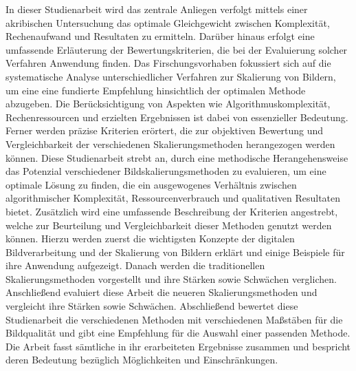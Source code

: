     In dieser Studienarbeit wird das zentrale Anliegen verfolgt mittels einer akribischen Untersuchung das optimale Gleichgewicht zwischen Komplexität, Rechenaufwand und Resultaten zu ermitteln. 
    Darüber hinaus erfolgt eine umfassende Erläuterung der Bewertungskriterien, die bei der Evaluierung solcher Verfahren Anwendung finden. 
    Das Firschungsvorhaben fokussiert sich auf die systematische Analyse unterschiedlicher Verfahren zur Skalierung von Bildern, um eine eine fundierte Empfehlung hinsichtlich der optimalen Methode abzugeben. 
    Die Berücksichtigung von Aspekten wie Algorithmuskomplexität, Rechenressourcen und erzielten Ergebnissen ist dabei von essenzieller Bedeutung. 
    Ferner werden präzise Kriterien erörtert, die zur objektiven Bewertung und Vergleichbarkeit der verschiedenen Skalierungsmethoden herangezogen werden können.
    Diese Studienarbeit strebt an, durch eine methodische Herangehensweise das Potenzial verschiedener Bildskalierungsmethoden zu evaluieren, um eine optimale Lösung zu finden, die ein ausgewogenes Verhältnis zwischen algorithmischer Komplexität, Ressourcenverbrauch und qualitativen Resultaten bietet. 
    Zusätzlich wird eine umfassende Beschreibung der Kriterien angestrebt, welche zur Beurteilung und Vergleichbarkeit dieser Methoden genutzt werden können.
    Hierzu werden zuerst die wichtigsten Konzepte der digitalen Bildverarbeitung und der Skalierung von Bildern erklärt und einige Beispiele für ihre Anwendung aufgezeigt. 
    Danach werden die traditionellen Skalierungsmethoden vorgestellt und  ihre Stärken sowie Schwächen verglichen. 
    Anschließend evaluiert diese Arbeit die neueren Skalierungsmethoden und vergleicht ihre Stärken sowie Schwächen. 
    Abschließend bewertet diese Studienarbeit die verschiedenen Methoden mit verschiedenen Maßstäben für die Bildqualität und gibt eine Empfehlung für die Auswahl einer passenden Methode. 
    Die Arbeit fasst sämtliche in ihr erarbeiteten Ergebnisse zusammen und bespricht deren Bedeutung bezüglich Möglichkeiten und Einschränkungen.
    \newpage